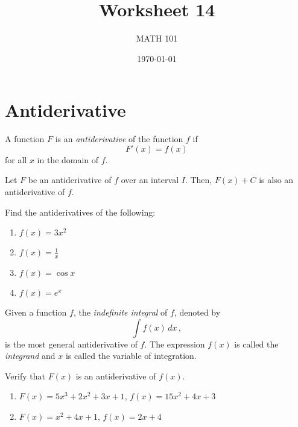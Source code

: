 \documentclass[12pt]{amsart}
\title{ Worksheet 14}
\author{MATH 101}
\date{\today}
\begin{document}
\maketitle



\section*{Antiderivative}

\begin{definition}
	A function $F$ is an \emph{antiderivative} of the function $f$ if
	\begin{equation*}
		F'(x) = f(x)
	\end{equation*}
	for all $x$ in the domain of $f$.
\end{definition}

\begin{theorem}
	Let $F$ be an antiderivative of $f$ over an interval $I$.
	Then, $F(x) + C$ is also an antiderivative of $f$.
\end{theorem}


\begin{problem}
Find the antiderivatives of the following:
\begin{enumerate}
	\item $f(x) = 3x^2$
	      \vspace{3cm}
	\item $f(x) = \frac{1}{x}$
	      \vspace{3cm}
	\item $f(x) = \cos x$
	      \vspace{3cm}
	\item $f(x) = e^x $
	      \vspace{3cm}
\end{enumerate}
\end{problem}


\begin{definition}
	Given a function $f$, the \emph{indefinite integral} of $f$, denoted by
	\begin{equation*}
		\int f(x) \, dx \,,
	\end{equation*}
	is the most general antiderivative of $f$.
	The expression $f(x)$ is called the \emph{integrand} and $x$ is called
	the variable of integration.
\end{definition}

\begin{problem}
Verify that $F(x)$ is an antiderivative of $f(x)$.
\begin{enumerate}
	\item $F(x) = 5x^3 +2x^2 + 3x + 1$, $f(x) = 15x^2 + 4x +3$
	      \vspace{5cm}
	\item $F(x) = x^2 + 4x +1$, $f(x) = 2x + 4$
	      \vspace{5cm}
\end{enumerate}
\end{problem}
\end{document}
